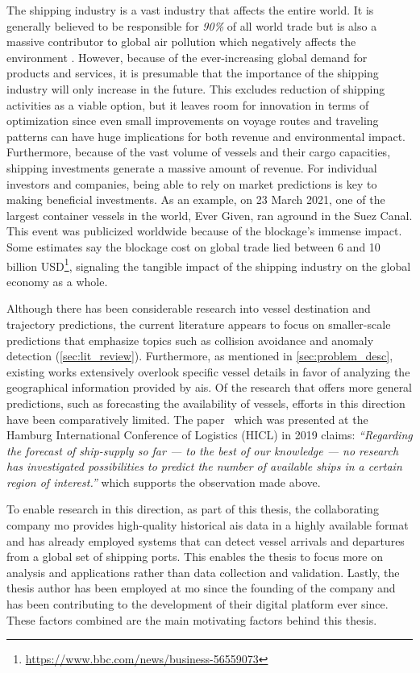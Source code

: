 The shipping industry is a vast industry that affects the entire world. It is generally believed to be responsible for \textit{90\%} of all world trade \parencite{maritime_studies@2011} but is also a massive contributor to global air pollution which negatively affects the environment \parencite{zheng2016:online}. However, because of the ever-increasing global demand for products and services, it is presumable that the importance of the shipping industry will only increase in the future. This excludes reduction of shipping activities as a viable option, but it leaves room for innovation in terms of optimization since even small improvements on voyage routes and traveling patterns can have huge implications for both revenue and environmental impact. Furthermore, because of the vast volume of vessels and their cargo capacities, shipping investments generate a massive amount of revenue. For individual investors and companies, being able to rely on market predictions is key to making beneficial investments. As an example, on 23 March 2021, one of the largest container vessels in the world, Ever Given, ran aground in the Suez Canal. This event was publicized worldwide because of the blockage's immense impact. Some estimates say the blockage cost on global trade lied between 6 and 10 billion USD\footnote{\url{https://www.bbc.com/news/business-56559073}}, signaling the tangible impact of the shipping industry on the global economy as a whole.

Although there has been considerable research into vessel destination and trajectory predictions, the current literature appears to focus on smaller-scale predictions that emphasize topics such as collision avoidance and anomaly detection (\cref{sec:lit_review}). Furthermore, as mentioned in \cref{sec:problem_desc}, existing works extensively overlook specific vessel details in favor of analyzing the geographical information provided by \acrshort{ais}. Of the research that offers more general predictions, such as forecasting the availability of vessels, efforts in this direction have been comparatively limited. The paper~\cite{lechtenberg2019} which was presented at the Hamburg International Conference of Logistics (HICL) in 2019 claims: \textit{“Regarding the forecast of ship-supply so far --- to the best of our knowledge --- no research has investigated possibilities to predict the number of available ships in a certain region of interest.”} which supports the observation made above.

To enable research in this direction, as part of this thesis, the collaborating company \acrfull{mo} provides high-quality historical \acrshort{ais} data in a highly available format and has already employed systems that can detect vessel arrivals and departures from a global set of shipping ports. This enables the thesis to focus more on analysis and applications rather than data collection and validation. Lastly, the thesis author has been employed at \acrshort{mo} since the founding of the company and has been contributing to the development of their digital platform ever since. These factors combined are the main motivating factors behind this thesis.

